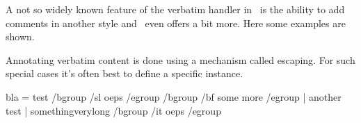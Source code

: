 
%
%


\startbuffer[abstract]
    A not so widely known feature of the verbatim handler in \CONTEXT\ is the
    ability to add comments in another style and \MKIV\ even offers a bit more.
    Here some examples are shown.
\stopbuffer

\startdocument
  [title={Annotated Verbatim},
   author=Hans Hagen,
   affiliation=PRAGMA ADE,
   date=July 2011,
   number=1102 \MKIV]


Annotating verbatim content is done using a mechanism called escaping. For such
special cases it's often best to define a specific instance.

\startbuffer[define]
\stopbuffer

\startbuffer[example]
\startannotatedtyping
bla = test               /bgroup /sl oeps /egroup
                         /bgroup /bf some more /egroup
    | another test
    | somethingverylong  /bgroup /it oeps /egroup
\stopannotatedtyping
\stopbuffer

 \getbuffer[define]

\starttextbackground[example]
    \getbuffer[example]
\stoptextbackground

